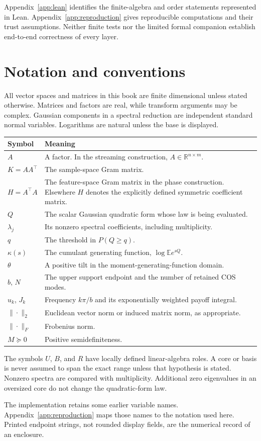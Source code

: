 Appendix~\ref{app:lean} identifies the finite-algebra and order statements represented in Lean. Appendix~\ref{app:reproduction} gives reproducible computations and their trust assumptions. Neither finite tests nor the limited formal companion establish end-to-end correctness of every layer.

\chapter*{Notation and conventions}
All vector spaces and matrices in this book are finite dimensional unless stated otherwise. Matrices and factors are real, while transform arguments may be complex. Gaussian components in a spectral reduction are independent standard normal variables. Logarithms are natural unless the base is displayed.

\begin{longtable}{@{}P{.18\linewidth}P{.76\linewidth}@{}}
\toprule Symbol & Meaning\\\midrule\endhead
$A$ & A factor. In the streaming construction, $A\in\mathbb R^{n\times m}$.\\
$K=AA^\top$ & The sample-space Gram matrix.\\
$H=A^\top A$ & The feature-space Gram matrix in the phase construction. Elsewhere $H$ denotes the explicitly defined symmetric coefficient matrix.\\
$Q$ & The scalar Gaussian quadratic form whose law is being evaluated.\\
$\lambda_j$ & Its nonzero spectral coefficients, including multiplicity.\\
$q$ & The threshold in $P(Q\ge q)$.\\
$\kappa(s)$ & The cumulant generating function, $\log\mathbb E e^{sQ}$.\\
$\theta$ & A positive tilt in the moment-generating-function domain.\\
$b$, $N$ & The upper support endpoint and the number of retained COS modes.\\
$u_k$, $J_k$ & Frequency $k\pi/b$ and its exponentially weighted payoff integral.\\
$\|\cdot\|_2$ & Euclidean vector norm or induced matrix norm, as appropriate.\\
$\|\cdot\|_F$ & Frobenius norm.\\
$M\succeq0$ & Positive semidefiniteness.\\
\bottomrule
\end{longtable}
The symbols $U$, $B$, and $R$ have locally defined linear-algebra roles. A core or basis is never assumed to span the exact range unless that hypothesis is stated. Nonzero spectra are compared with multiplicity. Additional zero eigenvalues in an oversized core do not change the quadratic-form law.

The implementation retains some earlier variable names. Appendix~\ref{app:reproduction} maps those names to the notation used here. Printed endpoint strings, not rounded display fields, are the numerical record of an enclosure.
